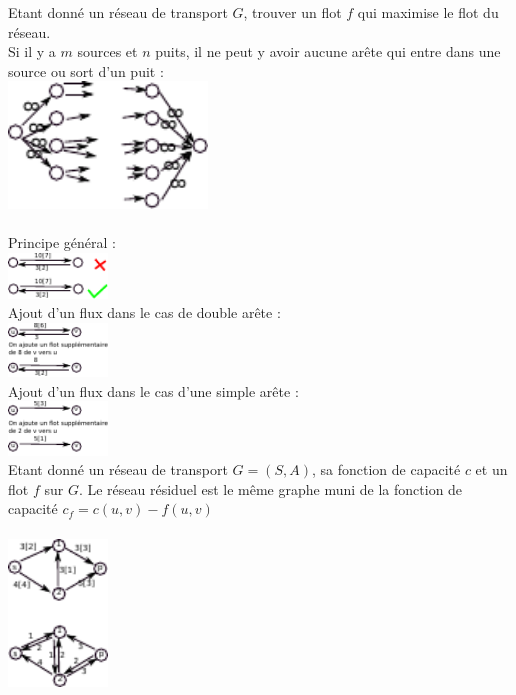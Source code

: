  Etant donné un réseau de transport $G$, trouver un flot $f$ qui maximise le flot du réseau. \\ 

 Si il y a $m$ sources et $n$ puits, il ne peut y avoir aucune arête qui entre dans une source ou sort d'un puit :\\
\includegraphics[width=200px]{Images/fig32.pdf}\\

\\
Principe général : \\
\includegraphics[width=100px]{Images/fig33.pdf}\\
Ajout d'un flux dans le cas de double arête : \\
\includegraphics[width=100px]{Images/fig34.pdf}\\
Ajout d'un flux dans le cas d'une simple arête :\\
\includegraphics[width=100px]{Images/fig35.pdf}\\

 Etant donné un réseau de transport $G=(S,A)$, sa fonction de capacité $c$ et un flot $f$ sur $G$. Le réseau résiduel est le même graphe muni de la fonction de capacité $c_f = c(u,v) - f(u,v)$\\

\\
\includegraphics[width=100px]{Images/fig36.pdf}\\

